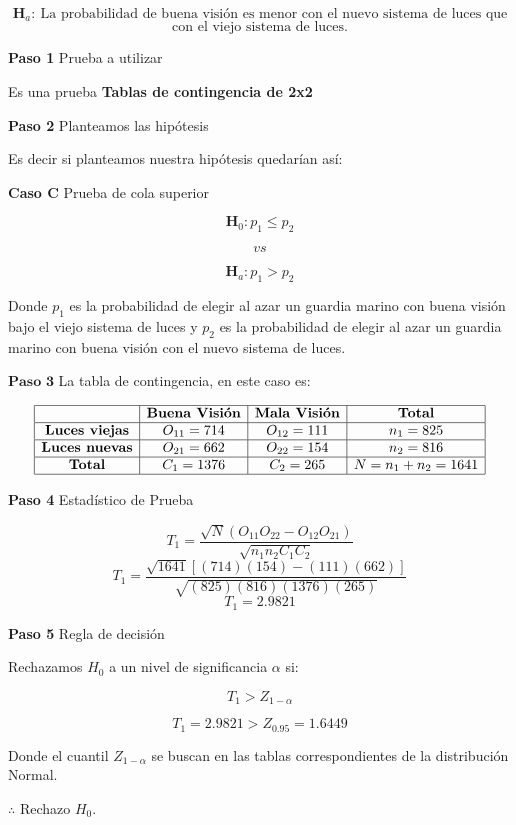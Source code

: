 \documentclass[
  a4paper,
  oneside,
  openany]{book}
\begin{document}
\[\textbf{H}_a: \ \mbox{La probabilidad de buena visión es menor con el nuevo sistema de luces que}\]
\[\mbox{con el viejo sistema de luces.}\]

\textbf{Paso 1} Prueba a utilizar

Es una prueba \textbf{Tablas de contingencia de 2x2}

\textbf{Paso 2} Planteamos las hipótesis

Es decir si planteamos nuestra hipótesis quedarían así:

\textbf{Caso C} Prueba de cola superior

\[\textbf{H}_0: p_{1} \leq p_{2}\]

\[vs\]

\[\textbf{H}_a: p_{1} > p_{2}\]

Donde \(p_{1}\) es la probabilidad de elegir al azar un guardia marino con buena visión bajo el viejo sistema de luces y \(p_{2}\) es la probabilidad de elegir al azar un guardia marino con buena visión con el nuevo sistema de luces.

\(\textbf{Paso 3}\) La tabla de contingencia, en este caso es:

\[
\begin{array}{|c|c|c|c|}
\hline
 & \textbf{Buena Visión} & \textbf{Mala Visión} & \textbf{Total}   \\
\hline
\textbf{Luces viejas} & O_{11}= 714 & O_{12}=111 & n_{1}=825   \\
\hline
\textbf{Luces nuevas} & O_{21}=662 & O_{22}=154 & n_{2}=816\\
\hline
\textbf{Total}  & C_{1}=1376 & C_{2}=265   & N=n_{1}+n_{2}=1641 \\
\hline
\end{array}
\]

\textbf{Paso 4} Estadístico de Prueba

\[T_{1}=\frac{\sqrt{N}(O_{11}O_{22}-O_{12}O_{21})}{\sqrt{n_{1}n_{2}C_{1}C_{2}}}\]
\[T_{1}=\frac{\sqrt{1641}[(714)(154)-(111)(662)]}{\sqrt{(825)(816)(1376)(265)}}\]
\[T_{1}= 2.9821\]

\textbf{Paso 5} Regla de decisión

Rechazamos \(H_0\) a un nivel de significancia \(\alpha\) si:

\[T_{1} > Z_{1-\alpha}\]

\[T_{1}=2.9821 > Z_{0.95}= 1.6449\]

Donde el cuantil \(Z_{1-\alpha}\) se buscan en las tablas correspondientes de la distribución Normal.

\(\therefore\) Rechazo \(H_0\).
\end{document}
